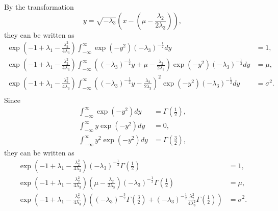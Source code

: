%
By the transformation
%
\begin{equation}
y = \sqrt{- \lambda_3} \left( x - \left( \mu - \frac{\lambda_2}{2 \lambda_3} \right) \right),
\end{equation}
%
they can be written as
%
\begin{equation}
\begin{aligned}
\exp \left( - 1 + \lambda_1 - \frac{\lambda_2 ^ 2}{4 \lambda_3} \right) \int_{- \infty}^{\infty} \exp \left( - y ^ 2 \right) (- \lambda_3) ^ {- \frac{1}{2}} dy &= 1,\\
\exp \left( - 1 + \lambda_1 - \frac{\lambda_2 ^ 2}{4 \lambda_3} \right) \int_{- \infty}^{\infty} \left( (- \lambda_3) ^ {- \frac{1}{2}} y + \mu - \frac{\lambda_2}{2 \lambda_3} \right) \exp \left( - y ^ 2 \right) (- \lambda_3) ^ {- \frac{1}{2}} dy &= \mu,\\
\exp \left( - 1 + \lambda_1 - \frac{\lambda_2 ^ 2}{4 \lambda_3} \right) \int_{- \infty}^{\infty} \left( (- \lambda_3) ^ {- \frac{1}{2}} y - \frac{\lambda_2}{2 \lambda_3} \right) ^ 2 \exp \left( - y ^ 2 \right) (- \lambda_3) ^ {- \frac{1}{2}} dy &= \sigma ^ 2.\\
\end{aligned}
\end{equation}
%
Since
%
\begin{equation}
\begin{aligned}
\int_{- \infty}^{\infty} \exp \left( - y ^ 2 \right) dy &= \Gamma \left( \frac{1}{2} \right), \\
\int_{- \infty}^{\infty} y \exp \left( - y ^ 2 \right) dy &= 0, \\
\int_{- \infty}^{\infty} y ^ 2 \exp \left( - y ^ 2 \right) dy &= \Gamma \left( \frac{3}{2} \right),
\end{aligned}
\end{equation}
%
they can be written as
%
\begin{equation}
\begin{aligned}
\exp \left( - 1 + \lambda_1 - \frac{\lambda_2 ^ 2}{4 \lambda_3} \right) (- \lambda_3) ^ {- \frac{1}{2}} \Gamma \left( \frac{1}{2} \right) &= 1, \\
\exp \left( - 1 + \lambda_1 - \frac{\lambda_2 ^ 2}{4 \lambda_3} \right) \left( \mu - \frac{\lambda_2}{2 \lambda_3} \right) (- \lambda_3) ^ {- \frac{1}{2}} \Gamma \left( \frac{1}{2} \right) &= \mu, \\
\exp \left( - 1 + \lambda_1 - \frac{\lambda_2 ^ 2}{4 \lambda_3} \right) \left( (- \lambda_3) ^ {- \frac{3}{2}} \Gamma \left( \frac{3}{2} \right) + (- \lambda_3) ^ {- \frac{1}{2}} \frac{\lambda_2 ^ 2}{4 \lambda_3 ^ 2} \Gamma \left( \frac{1}{2} \right) \right) &= \sigma ^ 2.
\end{aligned}
\end{equation}
